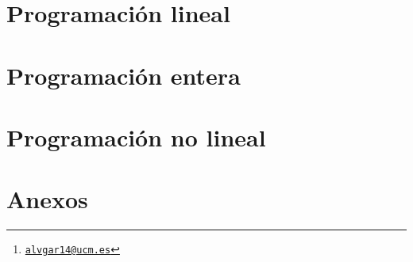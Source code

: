 \documentclass[a4paper, 10pt, twoside, titlepage, openright, onecolumn, final]{book}
\title{\tb{Investigación Operativa}}
\author{Álvaro García Tenorio
	\thanks{\texttt{\url{alvgar14@ucm.es}}}}
\date{\today}
\begin{document}
	\frontmatter
	\maketitle
	\tableofcontents
	
	
	\mainmatter
	\part{Programación lineal}
	
	
	
	\part{Programación entera}
	
	
	
	\part{Programación no lineal}
	\appendix
	\part{Anexos}
	
	\backmatter
	\printindex[general]
\end{document}
